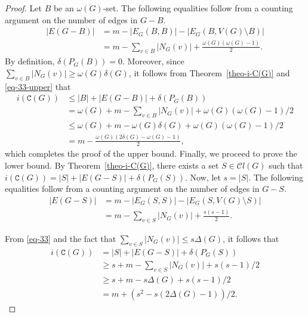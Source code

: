 \documentclass[12pt]{article}
\begin{document}
\begin{proof}
Let $B$ be an $\omega(G)$-set. The following equalities follow from a counting argument on the number of edges in $G-B$.
\begin{equation}\label{eq-33-upper}
\begin{split}
|E(G-B)| &= m - |E_G(B,B)| - |E_G(B, V(G) \setminus B)| \\[4pt]
&= m - \sum_{v \in B}|N_G(v)|+\frac{\omega(G)(\omega(G)-1)}{2}.
\end{split}
\end{equation}
By definition, $\delta(P_{G}(B)) = 0$. Moreover, since $\sum_{v \in B} |N_G(v)| \geq \omega(G)\delta(G)$, it follows from Theorem~\ref{theo-i-C(G)} and \eqref{eq-33-upper} that		
\begin{equation*}\label{eq-4-upper}
\begin{split}
i(\mathtt{C}(G))&\leq |B| + |E(G-B)| + \delta(P_{G}(B))\\[4pt] 
&=  \omega(G) + m - \sum_{v \in B} |N_G(v)| + \omega(G)(\omega(G)-1)/2  \\[4pt] 
&\leq \omega(G) + m - \omega(G)\delta(G) +\omega(G)(\omega(G)-1)/2 \\[5pt] 
&= m - \frac{\omega(G) ( 2\delta(G) - \omega(G) - 1)}{2},
\end{split}
\end{equation*}
which completes the proof of the upper bound. Finally, we proceed to prove the lower bound. By Theorem~\ref{theo-i-C(G)}, there exists a set $S \in \mathcal{C}l(G)$ such that 
$i(\mathtt{C}(G))=|S|+ |E(G-S)| + \delta(P_{G}(S))$.
Now, let $s = |S|$.  The following equalities follow from a counting argument on the number of edges in $G-S$.
\begin{equation}\label{eq-33}
\begin{split}
|E(G-S)| &= m - |E_G(S,S)| - |E_G(S, V(G) \setminus S)| \\[4pt]
&= m - \sum_{v \in S} |N_G(v)| + \frac{s(s-1)}{2}. 
\end{split}
\end{equation}

\noindent
From \eqref{eq-33} and the fact that $\sum_{v \in S} |N_G(v)| \leq s\Delta(G)$, it follows that 
\begin{equation*}\label{eq-4}
\begin{split}
i(\mathtt{C}(G))&=|S| + |E(G-S)| + \delta(P_{G}(S))\\[4pt] 
&\geq  s + m - \sum_{v \in S} |N_G(v)| + s(s-1)/2  \\[4pt] 
&\geq s + m - s\Delta(G) +s(s-1)/2 \\[7pt] 
&= m +(s^2-s(2\Delta(G)-1))/2.
\end{split}
\end{equation*}


\end{proof}
\end{document}
